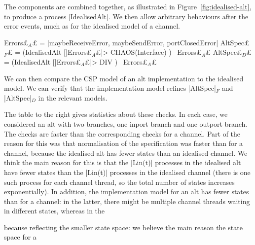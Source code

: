 
The components are combined together, as illustrated in
Figure~\ref{fig:idealised-alt}, to produce a process |IdealisedAlt|.  We
then allow arbitrary behaviours after the error events, much as for the
idealised model of a channel.
%
\begin{cspm}
Errors£$_A$£ = {|maybeReceiveError, maybeSendError, portClosedError|}
AltSpec£$_F$£ = (IdealisedAlt [|Errors£$_A$£|> CHAOS(Interface) ) \ Errors£$_A$£
AltSpec£$_D$£ = (IdealisedAlt [|Errors£$_A$£|> DIV ) \ Errors£$_A$£
\end{cspm}

We can then compare the CSP model of an alt implementation to the idealised
model.  We can verify that the implementation model refines |AltSpec|$_F$ and
|AltSpec|$_D$ in the relevant models.

\begin{window}
%
The table to the right gives statistics about these checks.  In each case, we
considered an alt with two branches, one inport branch and one outport
branch.  The checks are faster than the corresponding checks for a channel.
Part of the reason for this was that normalisation of the specification was
faster than for a channel, because the idealised alt has fewer states than an
idealised channel.  We think the main reason for this is that the |Lin(t)|
processes in the idealised alt have fewer states than the |Lin(t)| processes
in the idealised channel (there is one such process for each channel thread,
so the total number of states increases exponentially).  In addition, the
implementation model for an alt has fewer states than for a channel: in the
latter, there might be multiple channel threads waiting in different states,
whereas in the 

because 
reflecting the smaller state space: we believe the main reason the state space
for a 

\end{window}


